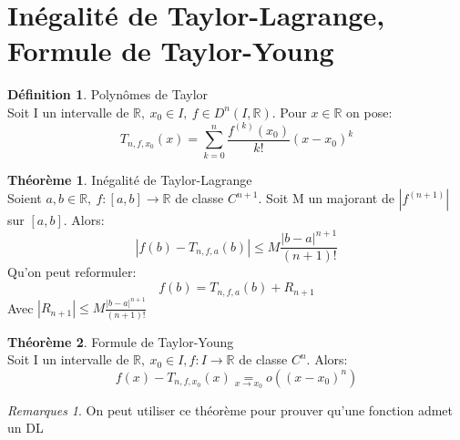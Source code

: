 \documentclass[fleqn]{article}
\theoremstyle{definition} \newtheorem*{defi}{D\'efinition}
\theoremstyle{definition} \newtheorem*{theo}{Th\'eor\`eme}
\theoremstyle{remark} \newtheorem*{rqs}{Remarques}
\theoremstyle{definition} \newtheorem*{prop}{Propri\'et\'e}
\begin{document}
\section{In\'egalit\'e de Taylor-Lagrange, Formule de Taylor-Young}
\begin{defi} Polyn\^omes de Taylor \\
	Soit I un intervalle de $\mathbb{R},\ x_0 \in I,\ f \in D^n(I, \mathbb{R})$. Pour $x \in \mathbb{R}$ on pose:
	\[T_{n,f,x_0}(x) = \sum_{k=0}^{n} \frac{f^{(k)}(x_0)}{k!}(x-x_0)^k\]
\end{defi}

\begin{theo} In\'egalit\'e de Taylor-Lagrange\\
	Soient $a,b \in \mathbb{R},\ f:[a,b] \rightarrow \mathbb{R}$ de classe $C^{n+1}$. Soit M un majorant de $|f^{(n+1)}|$ sur $[a,b]$. Alors:
	\[|f(b) - T_{n,f,a}(b)| \leq M\frac{|b-a|^{n+1}}{(n+1)!}\]
	Qu'on peut reformuler:
	\[f(b) = T_{n,f,a}(b) + R_{n+1}\]
	Avec $|R_{n+1}| \leq M \frac{|b-a|^{n+1}}{(n+1)!}$
\end{theo}

\begin{theo} Formule de Taylor-Young\\
	Soit I un intervalle de $\mathbb{R},\ x_0 \in I, f:I\rightarrow \mathbb{R}$ de classe $C^n$. Alors:
	\[f(x) - T_{n,f,x_0}(x) \underset{x \rightarrow x_0}{=} o((x-x_0)^n)\]

	\begin{rqs}
		On peut utiliser ce th\'eor\`eme pour prouver qu'une fonction admet un DL
	\end{rqs}
\end{theo}
\end{document}
